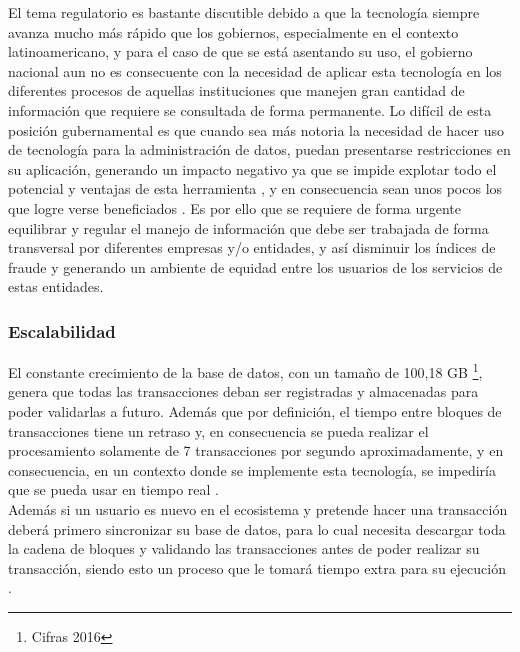 El tema regulatorio es bastante discutible debido a que la tecnología siempre avanza mucho más rápido que los gobiernos, especialmente en el contexto latinoamericano, y para el caso de \blckchn que se está asentando su uso, el gobierno nacional aun no es consecuente con la necesidad de aplicar esta tecnología en los diferentes procesos de aquellas instituciones que manejen gran cantidad de información que requiere se consultada de forma permanente. Lo difícil de esta posición gubernamental es que cuando sea más notoria la necesidad de hacer uso de tecnología para la administración de datos, puedan presentarse restricciones en su aplicación, generando un impacto negativo ya que se impide explotar todo el potencial y ventajas de esta herramienta \citep{banafa2017Blockchain}, y en consecuencia sean unos pocos los que logre verse beneficiados \citep{cabral2018EstadoArte}. Es por ello que se requiere de forma urgente equilibrar y regular el manejo de información que debe ser trabajada de forma transversal por diferentes empresas y/o entidades, y así disminuir los índices de fraude y generando un ambiente de equidad entre los usuarios de los servicios de estas entidades.

\subsubsection{Escalabilidad}

El constante crecimiento de la base de datos, con un tamaño de 100,18 GB \footnote{Cifras 2016}, genera que todas las transacciones deban ser registradas y almacenadas para poder validarlas a futuro. Además que por definición, el tiempo entre bloques de transacciones tiene un retraso y, en consecuencia se pueda realizar el procesamiento solamente de 7 transacciones por segundo aproximadamente, y en consecuencia, en un contexto donde se implemente esta tecnología, se impediría que se pueda usar en tiempo real \citep{zheng2016blockchain}.  
\\
Además si un usuario es nuevo en el ecosistema y pretende hacer una transacción deberá primero sincronizar su base de datos, para lo cual necesita descargar toda la cadena de bloques y validando las transacciones antes de poder realizar su transacción, siendo esto un proceso que le tomará tiempo extra para su ejecución \citep{crosby2016blockchain}.

